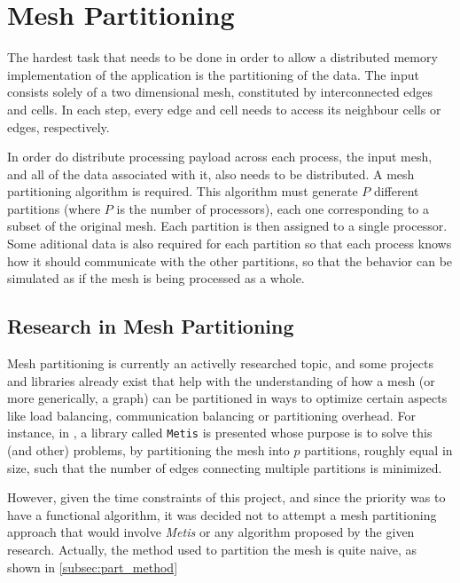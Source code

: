 \section{Mesh Partitioning}
\label{sec:partitioning}

The hardest task that needs to be done in order to allow a distributed memory implementation of the application is the partitioning of the data. The input consists solely of a two dimensional mesh, constituted by interconnected edges and cells. In each step, every edge and cell needs to access its neighbour cells or edges, respectively.

In order do distribute processing payload across each process, the input mesh, and all of the data associated with it, also needs to be distributed. A mesh partitioning algorithm is required. This algorithm must generate $P$ different partitions (where $P$ is the number of processors), each one corresponding to a subset of the original mesh. Each partition is then assigned to a single processor. Some aditional data is also required for each partition so that each process knows how it should communicate with the other partitions, so that the behavior can be simulated as if the mesh is being processed as a whole.

\subsection{Research in Mesh Partitioning}
\label{subsec:part_research}

Mesh partitioning is currently an activelly researched topic, and some projects and libraries already exist that help with the understanding of how a mesh (or more generically, a graph) can be partitioned in ways to optimize certain aspects like load balancing, communication balancing or partitioning overhead. For instance, in \cite{metis}, a library called \texttt{Metis} is presented whose purpose is to solve this (and other) problems, by partitioning the mesh into $p$ partitions, roughly equal in size, such that the number of edges connecting multiple partitions is minimized.


However, given the time constraints of this project, and since the priority was to have a functional algorithm, it was decided not to attempt a mesh partitioning approach that would involve \textit{Metis} or any algorithm proposed by the given research. Actually, the method used to partition the mesh is quite naive, as shown in \cref{subsec:part_method}

